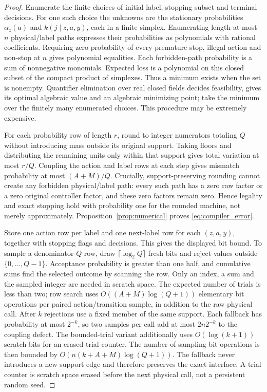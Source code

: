 \begin{proof}
Enumerate the finite choices of initial label, stopping subset and terminal decisions. For one such choice the unknowns are the stationary probabilities $\alpha_z(a)$ and $k(j\mid z,a,y)$, each in a finite simplex. Enumerating length-at-most-$n$ physical/label paths expresses their probabilities as polynomials with rational coefficients. Requiring zero probability of every premature stop, illegal action and non-stop at $n$ gives polynomial equalities. Each forbidden-path probability is a sum of nonnegative monomials. Expected loss is a polynomial on this closed subset of the compact product of simplexes. Thus a minimum exists when the set is nonempty. Quantifier elimination over real closed fields decides feasibility, gives its optimal algebraic value and an algebraic minimizing point; take the minimum over the finitely many enumerated choices\cite{bpr}. This procedure may be extremely expensive.

For each probability row of length $r$, round to integer numerators totaling $Q$ without introducing mass outside its original support. Taking floors and distributing the remaining units only within that support gives total variation at most $r/Q$. Coupling the action and label rows at each step gives mismatch probability at most $(A+M)/Q$. Crucially, support-preserving rounding cannot create any forbidden physical/label path: every such path has a zero raw factor or a zero original controller factor, and these zero factors remain zero. Hence legality and exact stopping hold with probability one for the rounded machine, not merely approximately. Proposition~\ref{prop:numerical} proves \eqref{eq:compiler_error}.

Store one action row per label and one next-label row for each $(z,a,y)$, together with stopping flags and decisions. This gives the displayed bit bound. To sample a denominator-$Q$ row, draw $\lceil\log_2Q\rceil$ fresh bits and reject values outside $\{0,\ldots,Q-1\}$. Acceptance probability is greater than one half, and cumulative sums find the selected outcome by scanning the row. Only an index, a sum and the sampled integer are needed in scratch space. The expected number of trials is less than two; row search uses $O((A+M)\log(Q+1))$ elementary bit operations per paired action/transition sample, in addition to the raw physical call. After $k$ rejections use a fixed member of the same support. Each fallback has probability at most $2^{-k}$, so two samples per call add at most $2n2^{-k}$ to the coupling defect. The bounded-trial variant additionally uses $O(\log(k+1))$ scratch bits for an erased trial counter. The number of sampling bit operations is then bounded by $O(n(k+A+M)\log(Q+1))$. The fallback never introduces a new support edge and therefore preserves the exact interface. A trial counter is scratch space erased before the next physical call, not a persistent random seed.
\end{proof}
